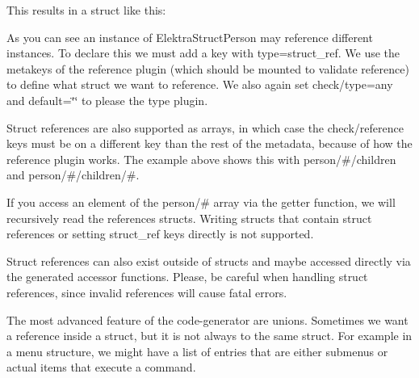 This results in a struct like this\+:


\begin{DoxyCode}{0}
\DoxyCodeLine{\{}
\end{DoxyCode}


As you can see an instance of {\ttfamily Elektra\+Struct\+Person} may reference different instances. To declare this we must add a key with {\ttfamily type=struct\+\_\+ref}. We use the metakeys of the {\ttfamily reference} plugin (which should be mounted to validate reference) to define what struct we want to reference. We also again set {\ttfamily check/type=any} and {\ttfamily default=\char`\"{}\char`\"{}} to please the {\ttfamily type} plugin.

Struct references are also supported as arrays, in which case the {\ttfamily check/reference} keys must be on a different key than the rest of the metadata, because of how the {\ttfamily reference} plugin works. The example above shows this with {\ttfamily person/\#/children} and {\ttfamily person/\#/children/\#}.

If you access an element of the {\ttfamily person/\#} array via the getter function, we will recursively read the references structs. Writing structs that contain struct references or setting {\ttfamily struct\+\_\+ref} keys directly is not supported.

Struct references can also exist outside of structs and maybe accessed directly via the generated accessor functions. Please, be careful when handling struct references, since invalid references will cause fatal errors.

The most advanced feature of the code-\/generator are unions. Sometimes we want a reference inside a struct, but it is not always to the same struct. For example in a menu structure, we might have a list of entries that are either submenus or actual items that execute a command.


